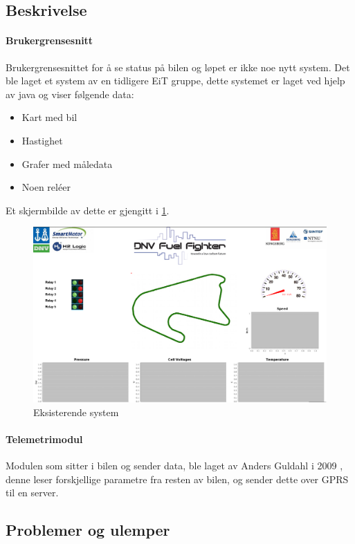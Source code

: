 \subsection{Beskrivelse}

\paragraph{Brukergrensesnitt}
Brukergrensesnittet for å se status på bilen og løpet er ikke noe nytt system. 
Det ble laget et system av en tidligere EiT gruppe, dette systemet er laget ved hjelp av java og viser følgende data:
\begin{itemize}
\item Kart med bil
\item Hastighet
\item Grafer med måledata
\item Noen reléer
\end{itemize}
Et skjermbilde av dette er gjengitt i \ref{fig:gammeljava}.

\begin{figure}[H]
\includegraphics[width=\textwidth]{images/java.png}
\caption{Eksisterende system}
\label{fig:gammeljava}
\end{figure}

\paragraph{Telemetrimodul}
Modulen som sitter i bilen og sender data, ble laget av Anders Guldahl i 2009 \cite{telemetrithesis}, denne leser forskjellige parametre fra resten av bilen, og sender dette over GPRS til en server.

\subsection{Problemer og ulemper}
